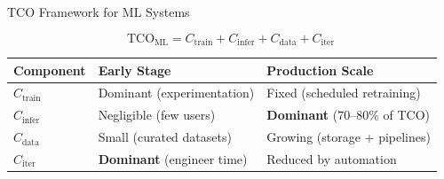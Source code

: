 \documentclass[aspectratio=169, 12pt]{beamer}
\newcommand{\TCO}{\text{TCO}_{\text{ML}}}
\begin{document}
\begin{frame}{TCO Framework for ML Systems}

\small
$$\TCO = C_{\text{train}} + C_{\text{infer}} + C_{\text{data}} + C_{\text{iter}}$$

\vspace{0.15cm}
{\footnotesize
\renewcommand{\arraystretch}{1.2}
\begin{tabular}{@{}lll@{}}
  \toprule
  \textbf{Component} & \textbf{Early Stage} & \textbf{Production Scale} \\
  \midrule
  $C_{\text{train}}$  & Dominant (experimentation)     & Fixed (scheduled retraining) \\
  $C_{\text{infer}}$  & Negligible (few users)         & \textcolor{errorstroke}{\textbf{Dominant}} (70--80\% of TCO) \\
  $C_{\text{data}}$   & Small (curated datasets)       & Growing (storage + pipelines) \\
  $C_{\text{iter}}$   & \textcolor{routingstroke}{\textbf{Dominant}} (engineer time)  & Reduced by automation \\
  \bottomrule
\end{tabular}
}

\vspace{0.15cm}

\end{frame}
\end{document}
